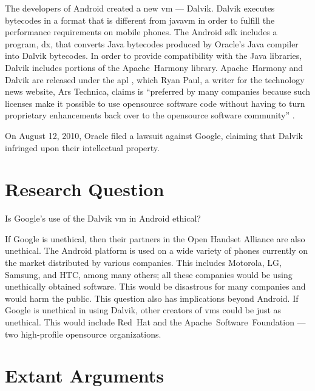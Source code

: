 \documentclass[11pt]{article}
\begin{document}
\begin{multicols}{2}
The developers of Android created a new \gls{vm} --- Dalvik.  Dalvik executes
\glspl{bytecode} in a format that is different from \gls{javavm} in order to
fulfill the performance requirements on mobile phones.  \cite{dalvik-bytecode}
\cite{dalvik-vm-arch} The Android \gls{sdk} includes a program, dx, that
converts Java \glspl{bytecode} produced by Oracle's Java compiler into Dalvik
\glspl{bytecode}.  \cite{android-sdk-building} In order to provide compatibility
with the Java libraries, Dalvik includes portions of the Apache~Harmony library.
\cite{apache-harmony} \cite{dalvik-readme}  Apache~Harmony and Dalvik are
released under the \gls{apl} \cite{apache-license}, which Ryan Paul, a writer for
the technology news website, Ars Technica, claims is ``preferred by many
companies because such licenses make it possible to use \gls{opensource}
software code without having to turn proprietary enhancements back over to the
\gls{opensource} software community'' \cite{why-apache2-license}.

On August 12, 2010, Oracle filed a lawsuit against Google, claiming that Dalvik
infringed upon their intellectual property. \cite[Count VIII]{oracle-lawsuit}


\section{Research Question} %
\label{sec:question}

Is Google's use of the Dalvik \gls{vm} in Android ethical?

If Google is unethical, then their partners in the Open Handset Alliance are
also unethical.  The Android platform is used on a wide variety of phones
currently on the market distributed by various companies.  This includes
Motorola, LG, Samsung, and HTC, among many others; all these companies would be
using unethically obtained software.  This would be disastrous for many
companies and would harm the public.  This question also has implications beyond
Android.  If Google is unethical in using Dalvik, other creators of \glspl{vm}
could be just as unethical.  This would include Red~Hat and the
Apache~Software~Foundation --- two high-profile \gls{opensource} organizations.


\section{Extant Arguments} %
\label{sec:args}


\end{multicols}
\end{document}
